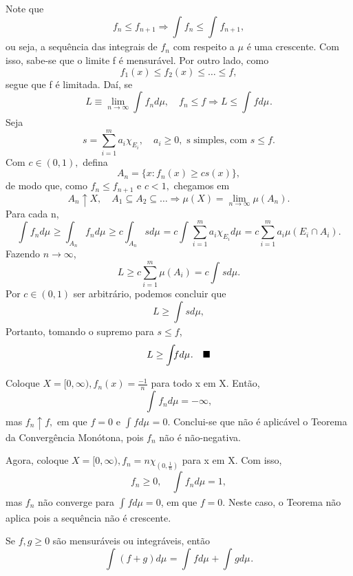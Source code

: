 \documentclass[MeasureTheory/measure_theory.tex]{subfiles}
\begin{document}
\begin{proof*}
	Note que
	\[
		f_{n}\leq f_{n+1} \Rightarrow \int_{}^{}f_{n}\leq \int_{}^{}f_{n+1},
	\]
	ou seja, a sequência das integrais de \(f_{n}\) com respeito a \(\mu \) é uma crescente. Com isso, sabe-se que o limite f é mensurável. Por outro lado, como
	\[
		f_1(x)\leq f_2(x)\leq \dotsc \leq f,
	\]
	segue que f é limitada. Daí, se
	\[
		L\equiv \lim_{n\to \infty}\int_{}^{}f_{n}d\mu ,\quad f_{n}\leq f \Rightarrow L \leq \int_{}f d\mu_{}.
	\]
	Seja
	\[
		s = \sum\limits_{i=1}^{m}a_{i}\chi_{E_{i}},\quad a_{i}\geq 0, \text{ s simples, com } s\leq f.
	\]
	Com \(c\in (0, 1),\) defina
	\[
		A_{n} = \{x: f_{n}(x) \geq cs(x)\},
	\]
	de modo que, como \(f_{n}\leq f_{n+1}\) e \(c < 1,\) chegamos em
	\[
		A_{n}\uparrow X,\quad A_1\subseteq A_2\subseteq \dotsc \Rightarrow \mu (X) = \lim_{n\to \infty}\mu (A_{n}).
	\]
	Para cada n,
	\[
		\int_{}f_{n} d\mu_{} \geq \int_{A_{n}}f_{n} d\mu_{} \geq c \int_{A_{n}}s d\mu_{} = c \int_{}\sum\limits_{i=1}^{m}a_{i}\chi_{E_{i}} d\mu_{} = c \sum\limits_{i=1}^{m}a_{i}\mu (E_{i}\cap A_{i}).
	\]
	Fazendo \(n\to \infty\),
	\[
		L \geq c \sum\limits_{i=1}^{m}\mu (A_{i}) = c \int_{}^{}s d\mu .
	\]
	Por \(c\in (0, 1)\) ser arbitrário, podemos concluir que
	\[
		L \geq \int_{}^{}s d\mu,
	\]
	Portanto, tomando o supremo para \(s \leq f\),
	\[
		L \geq \int_{}f d\mu_{}.\quad \text{$\blacksquare$}
	\]
\end{proof*}
\begin{example}
	Coloque \(X = [0, \infty), f_{n}(x) = \frac{-1}{n}\) para todo x em X. Então,
	\[
		\int_{}^{}f_{n}d\mu = -\infty,
	\]
	mas \(f_{n}\uparrow f,\) em que \(f=0\) e \(\int_{}f d\mu_{} = 0.\) Conclui-se que não é aplicável o Teorema da Convergência Monótona, pois \(f_{n}\) não é não-negativa.
\end{example}
\begin{example}
	Agora, coloque \(X = [0, \infty), f_{n} = n \chi_{(0, \frac{1}{n})}\) para x em X. Com isso,
	\[
		f_{n}\geq 0,\quad \int_{}^{}f_{n}d\mu = 1,
	\]
	mas \(f_{n}\) não converge para \(\int_{}^{}f d\mu = 0\), em que \(f=0\). Neste caso, o Teorema não aplica pois a sequência não é crescente.
\end{example}
\begin{theorem*}
	Se \(f, g \geq 0\) são mensuráveis ou integráveis, então
	\[
		\int_{}(f+g) d\mu_{} = \int_{}f d\mu_{} + \int_{}g d\mu_{}.
	\]
\end{theorem*}
\end{document}
